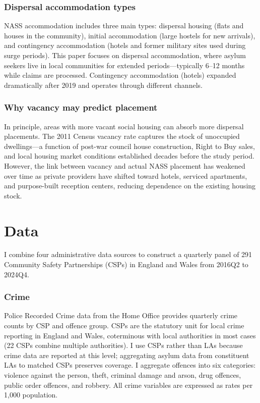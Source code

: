\documentclass[12pt]{article}
\begin{document}
\subsubsection*{Dispersal accommodation types} NASS accommodation includes three main types: dispersal housing (flats and houses in the community), initial accommodation (large hostels for new arrivals), and contingency accommodation (hotels and former military sites used during surge periods). This paper focuses on dispersal accommodation, where asylum seekers live in local communities for extended periods---typically 6--12 months while claims are processed. Contingency accommodation (hotels) expanded dramatically after 2019 and operates through different channels.

\subsubsection*{Why vacancy may predict placement} In principle, areas with more vacant social housing can absorb more dispersal placements. The 2011 Census vacancy rate captures the stock of unoccupied dwellings---a function of post-war council house construction, Right to Buy sales, and local housing market conditions established decades before the study period. However, the link between vacancy and actual NASS placement has weakened over time as private providers have shifted toward hotels, serviced apartments, and purpose-built reception centers, reducing dependence on the existing housing stock.


\section{Data}

I combine four administrative data sources to construct a quarterly panel of 291 Community Safety Partnerships (CSPs) in England and Wales from 2016Q2 to 2024Q4.

\subsubsection*{Crime} Police Recorded Crime data from the Home Office provides quarterly crime counts by CSP and offence group. CSPs are the statutory unit for local crime reporting in England and Wales, coterminous with local authorities in most cases (22 CSPs combine multiple authorities). I use CSPs rather than LAs because crime data are reported at this level; aggregating asylum data from constituent LAs to matched CSPs preserves coverage. I aggregate offences into six categories: violence against the person, theft, criminal damage and arson, drug offences, public order offences, and robbery. All crime variables are expressed as rates per 1,000 population.
\end{document}
